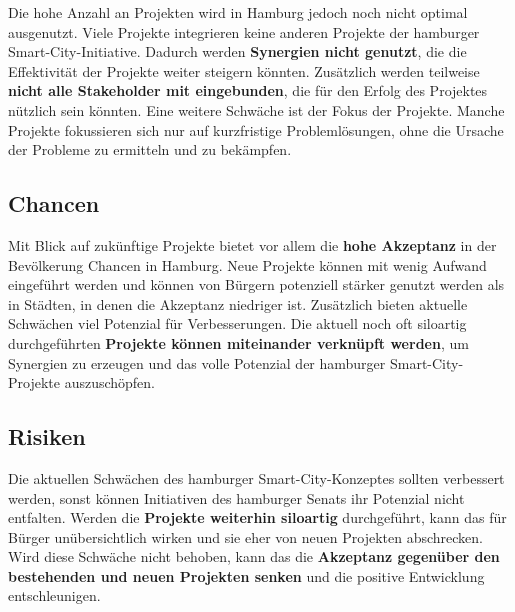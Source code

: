 Die hohe Anzahl an Projekten wird in Hamburg jedoch noch nicht optimal ausgenutzt. Viele Projekte integrieren keine anderen Projekte der hamburger Smart-City-Initiative. Dadurch werden \textbf{Synergien nicht genutzt}, die die Effektivität der Projekte weiter steigern könnten. Zusätzlich werden teilweise \textbf{nicht alle Stakeholder mit eingebunden}, die für den Erfolg des Projektes nützlich sein könnten. Eine weitere Schwäche ist der Fokus der Projekte. Manche Projekte fokussieren sich nur auf kurzfristige Problemlösungen, ohne die Ursache der Probleme zu ermitteln und zu bekämpfen.

\subsection{Chancen}

Mit Blick auf zukünftige Projekte bietet vor allem die \textbf{hohe Akzeptanz }in der Bevölkerung Chancen in Hamburg. Neue Projekte können mit wenig Aufwand eingeführt werden und können von Bürgern potenziell stärker genutzt werden als in Städten, in denen die Akzeptanz niedriger ist. Zusätzlich bieten aktuelle Schwächen viel Potenzial für Verbesserungen. Die aktuell noch oft siloartig durchgeführten \textbf{Projekte können miteinander verknüpft werden}, um Synergien zu erzeugen und das volle Potenzial der hamburger Smart-City-Projekte auszuschöpfen.

\subsection{Risiken}

Die aktuellen Schwächen des hamburger Smart-City-Konzeptes sollten verbessert werden, sonst können Initiativen des hamburger Senats ihr Potenzial nicht entfalten. Werden die \textbf{Projekte weiterhin siloartig }durchgeführt, kann das für Bürger unübersichtlich wirken und sie eher von neuen Projekten abschrecken. Wird diese Schwäche nicht behoben, kann das die \textbf{Akzeptanz gegenüber den bestehenden und neuen Projekten senken} und die positive Entwicklung entschleunigen.



